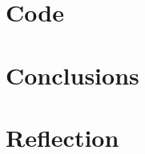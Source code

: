\documentclass[12pt]{article}
\begin{document}
\section{Code}















\section{Conclusions}




\section{Reflection}









\pagebreak

\nocite{*}












\end{document}
